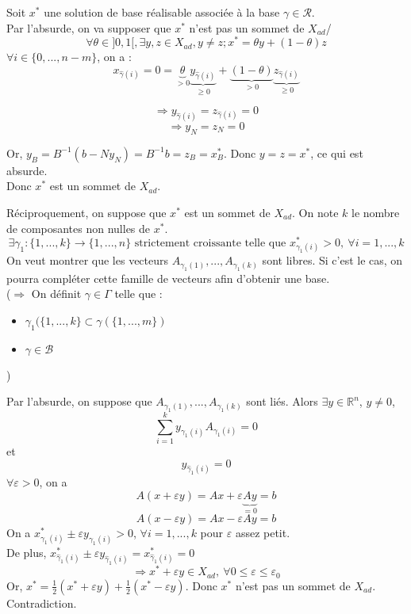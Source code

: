 \begin{dem}
Soit $x^*$ une solution de base réalisable associée à la base $\gamma\in\mathcal{R}$.\\
Par l'absurde, on va supposer que $x^*$ n'est pas un sommet de $X_{ad}$/ 
	\[\forall \theta\in]0,1[, \exists y,z\in X_{ad}, y\neq z; x^*=\theta y+(1-\theta)z\]
$\forall i\in\{0,...,n-m\}$, on a :
	\[x_{\hat{\gamma}(i)}=0=\underbrace{\theta}_{>0} \underbrace{y_{\hat{\gamma}(i)}}_{\geq 0} + \underbrace{(1-\theta)}_{>0}\underbrace{z_{\hat{\gamma}(i)}}_{\geq 0}\]

	\[\Rightarrow y_{\hat{\gamma}(i)}=z_{\hat{\gamma}(i)}=0\]
	\[\Rightarrow y_N=z_N=0\]

Or, $y_B=B^{-1}(b-Ny_N)=B^{-1}b=z_B=x^*_B$. Donc $y=z=x^*$, ce qui est absurde.\\
Donc $x^*$ est un sommet de $X_{ad}$.

\bigskip
Réciproquement, on suppose que $x^*$ est un sommet de $X_{ad}$. On note $k$ le nombre de composantes non nulles de $x^*$. 
\[\exists \gamma_1 : \{1,...,k\}\to\{1,...,n\} \text{ strictement croissante telle que } x^*_{\gamma_1(i)}>0,\ \forall i=1,...,k\]
On veut montrer que les vecteurs $A_{\gamma_1(1)},...,A_{\gamma_1(k)}$ sont libres. Si c'est le cas, on pourra compléter cette famille de vecteurs afin d'obtenir une base.\\
($\Rightarrow$ On définit $\gamma\in\Gamma$ telle que :\begin{itemize}
\item $\gamma_1(\{1,...,k\}\subset\gamma(\{1,...,m\})$
\item $\gamma\in\mathcal{B}$
\end{itemize})

Par l'absurde, on suppose que $A_{\gamma_1(1)},...,A_{\gamma_1(k)}$ sont liés. Alors $\exists y\in\mathbb{R}^n$, $y\neq 0$, 
\[\sum_{i=1}^k y_{\gamma_1(i)}A_{\gamma_1(i)}=0\]
et \[y_{\hat{\gamma}_1(i)}=0\]
$\forall \varepsilon>0$, on a \[A(x+\varepsilon y)=Ax+\varepsilon \underbrace{Ay}_{=0}=b\]
\[A(x-\varepsilon y)=Ax-\varepsilon Ay = b\]
On a $x^*_{\gamma_1(i)}\pm \varepsilon y_{\gamma_1(i)}>0$, $\forall i=1,...,k$ pour $\varepsilon$ assez petit.\\
De plus, $x^*_{\hat{\gamma}_1(i)}\pm \varepsilon y_{\hat{\gamma}_1(i)}=x^*_{\hat{\gamma}_1(i)}=0$
	\[\Rightarrow x^*+\varepsilon y\in X_{ad},\ \forall0\leq \varepsilon \leq \varepsilon_0\]
Or, $x^*=\frac{1}{2}(x^*+\varepsilon y) + \frac{1}{2}(x^*-\varepsilon y)$. Donc $x^*$ n'est pas un sommet de $X_{ad}$. Contradiction.
\end{dem}


